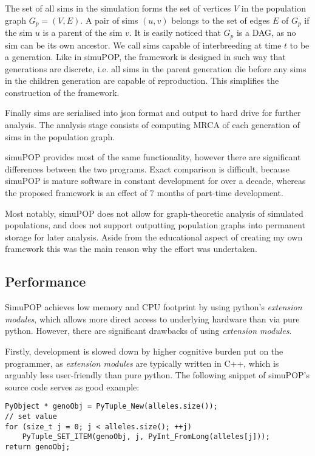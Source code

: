 \documentclass{l4proj}
\begin{document}
The set of all sims in the simulation forms the set of vertices $V$ in the \gls{population graph} $G_{p} = (V, E)$. A pair of sims $(u, v)$ belongs to the set of edges $E$ of $G_{p}$ if the sim $u$ is a parent of the sim $v$. It is easily noticed that $G_{p}$ is a DAG, as no sim can be its own ancestor. We call sims capable of interbreeding at time $t$ to be a generation. Like in simuPOP, the framework is designed in such way that generations are discrete, i.e. all sims in the parent generation die before any sims in the children generation are capable of reproduction. This simplifies the construction of the framework.

Finally sims are serialised into json format and output to hard drive for further analysis. The analysis stage consists of computing MRCA of each generation of sims in the population graph.

simuPOP provides most of the same functionality, however there are significant differences between the two programs. Exact comparison is difficult, because simuPOP is mature software in constant development for over a decade, whereas the proposed framework is an effect of 7 months of part-time development.

Most notably, simuPOP does not allow for graph-theoretic analysis of simulated populations, and does not support outputting population graphs into permanent storage for later analysis. Aside from the educational aspect of creating my own framework this was the main reason why the effort was undertaken.

\subsection{Performance}

SimuPOP achieves low memory and CPU footprint by using python's \textit{extension modules}, which allows more direct access to underlying hardware than via pure python. However, there are significant drawbacks of using \textit{extension modules}.

Firstly, development is slowed down by higher cognitive burden put on the programmer, as \textit{extension modules} are typically written in C++, which is arguably less user-friendly than pure python. The following snippet of simuPOP's source code serves as good example:

\begin{lstlisting}
PyObject * genoObj = PyTuple_New(alleles.size());
// set value
for (size_t j = 0; j < alleles.size(); ++j)
    PyTuple_SET_ITEM(genoObj, j, PyInt_FromLong(alleles[j]));
return genoObj;
\end{lstlisting}
\end{document}
